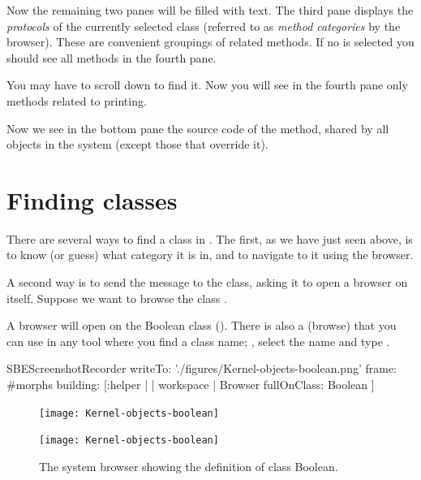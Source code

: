 \documentclass[a4paper,10pt,twoside]{book}
\begin{document}
Now the remaining two panes will be filled with text.
The third pane displays the \emph{protocols} of the currently selected class (referred to as \emph{method categories} by the browser).
These are convenient groupings of related methods.
If no  is selected you should see all methods in the fourth pane.

You may have to scroll down to find it.
Now you will see in the fourth pane only methods related to printing.

Now we see in the bottom pane the source code of the  method, shared by all objects in the system (except those that override it).

\section{Finding classes}

There are several ways to find a class in \sq.
The first, as we have just seen above, is to know (or guess) what category it is in, and to navigate to it using the browser.

A second way is to send the  message to the class, asking it to open a browser on itself.
Suppose we want to browse the class .

A browser will open on the Boolean class ().
There is also a   (browse) that you can use in any tool where you find a class name; , select the name and type .


\begin{ExecuteSmalltalkScript}
SBEScreenshotRecorder writeTo: './figures/Kernel-objects-boolean.png' frame: #morphs building: [:helper | | workspace |
  Browser fullOnClass: Boolean
]
\end{ExecuteSmalltalkScript}
\begin{figure}[hbt]
\ifluluelse
	{\centerline {\texttt{[image: Kernel-objects-boolean]}}}
	{\centerline {\texttt{[image: Kernel-objects-boolean]}}}
\caption{The system browser showing the definition of class Boolean.
\label{fig:browseBoolean}}
\end{figure}
\end{document}
